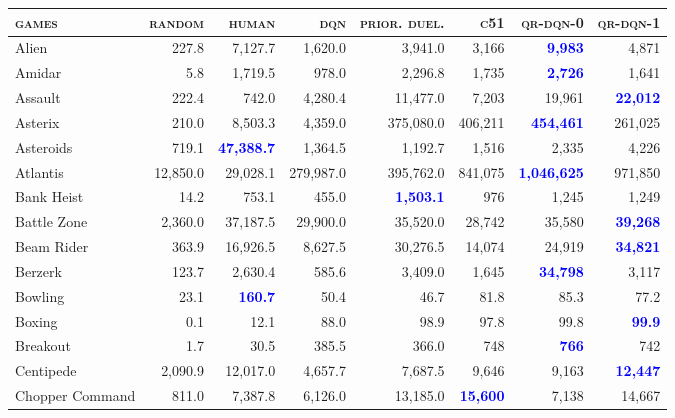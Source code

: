 \documentclass[letterpaper]{article}
\begin{document}
\newpage

\begin{figure*}
\small
\centering
\begin{tabular}{ l | r|r|r|r|r|r| r }
  \textbf{\textsc{games}}  &  \textbf{\textsc{random}}  &  \textbf{\textsc{human}}  &  \textbf{\textsc{dqn}}  &   \textbf{\textsc{prior.}} \textbf{\textsc{duel.}}  &  \textbf{\textsc{c51}} & \textbf{\textsc{qr-dqn-0}} & \textbf{\textsc{qr-dqn-1}}\\
\hline
Alien & 227.8 & 7,127.7 & 1,620.0 & 3,941.0 & 3,166 & \textbf{\textcolor{blue}{9,983}} & 4,871 \\
Amidar & 5.8 & 1,719.5 & 978.0 & 2,296.8 & 1,735 & \textbf{\textcolor{blue}{2,726}} & 1,641 \\
Assault & 222.4 & 742.0 & 4,280.4 & 11,477.0 & 7,203 & 19,961 & \textbf{\textcolor{blue}{22,012}} \\
Asterix & 210.0 & 8,503.3 & 4,359.0 & 375,080.0 & 406,211 & \textbf{\textcolor{blue}{454,461}} & 261,025 \\
Asteroids & 719.1 & \textbf{\textcolor{blue}{47,388.7}} & 1,364.5 & 1,192.7 & 1,516 & 2,335 & 4,226 \\
Atlantis & 12,850.0 & 29,028.1 & 279,987.0 & 395,762.0 & 841,075 & \textbf{\textcolor{blue}{1,046,625}} & 971,850 \\
Bank Heist & 14.2 & 753.1 & 455.0 & \textbf{\textcolor{blue}{1,503.1}} & 976 & 1,245 & 1,249 \\
Battle Zone & 2,360.0 & 37,187.5 & 29,900.0 & 35,520.0 & 28,742 & 35,580 & \textbf{\textcolor{blue}{39,268}} \\
Beam Rider & 363.9 & 16,926.5 & 8,627.5 & 30,276.5 & 14,074 & 24,919 & \textbf{\textcolor{blue}{34,821}} \\
Berzerk & 123.7 & 2,630.4 & 585.6 & 3,409.0 & 1,645 & \textbf{\textcolor{blue}{34,798}} & 3,117 \\
Bowling & 23.1 & \textbf{\textcolor{blue}{160.7}} & 50.4 & 46.7 & 81.8 & 85.3 & 77.2 \\
Boxing & 0.1 & 12.1 & 88.0 & 98.9 & 97.8 & 99.8 & \textbf{\textcolor{blue}{99.9}} \\
Breakout & 1.7 & 30.5 & 385.5 & 366.0 & 748 & \textbf{\textcolor{blue}{766}} & 742 \\
Centipede & 2,090.9 & 12,017.0 & 4,657.7 & 7,687.5 & 9,646 & 9,163 & \textbf{\textcolor{blue}{12,447}} \\
Chopper Command & 811.0 & 7,387.8 & 6,126.0 & 13,185.0 & \textbf{\textcolor{blue}{15,600}} & 7,138 & 14,667 \\

\end{tabular}
\end{figure*}
\end{document}

